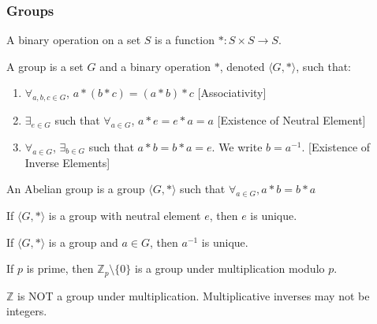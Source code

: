 \documentclass[crop=false,class=article,oneside]{standalone}
\begin{document}
        \subsubsection{Groups}
            \begin{definition}
                A binary operation on a set $S$ is a
                function $*:S\times S \rightarrow S$.
            \end{definition}
            \begin{definition}
                A group is a set $G$ and a binary operation $*$,
                denoted $\langle G,*\rangle$, such that:
                \begin{enumerate}
                    \item $\forall_{a,b,c\in G}$, $a*(b*c)=(a*b)*c$
                          \hfill[Associativity]
                    \item $\exists_{e\in G}$ such that
                          $\forall_{a\in G}$, $a*e=e*a=a$
                          \hfill[Existence of Neutral Element]
                    \item $\forall_{a\in G}$, $\exists_{b\in G}$
                          such that $a*b=b*a=e$.
                          We write $b=a^{-1}$.
                          \hfill[Existence of Inverse Elements]
                \end{enumerate}
            \end{definition}
            \begin{definition}
                An Abelian group is a group $\langle G,*\rangle$
                such that $\forall_{a\in G},a*b=b*a$
            \end{definition}
            \begin{theorem}
                If $\langle G, *\rangle$ is a group with neutral
                element $e$, then $e$ is unique.
            \end{theorem}
            \begin{theorem}
                If $\langle G,*\rangle$ is a group and $a\in G$,
                then $a^{-1}$ is unique.
            \end{theorem}
            \begin{theorem}
                If $p$ is prime, then
                $\mathbb{Z}_p\setminus \{0\}$ is a group
                under multiplication modulo $p$.
            \end{theorem}
            \begin{remark}
                $\mathbb{Z}$ is NOT a group under
                multiplication. Multiplicative inverses may
                not be integers.
            \end{remark}
\end{document}

